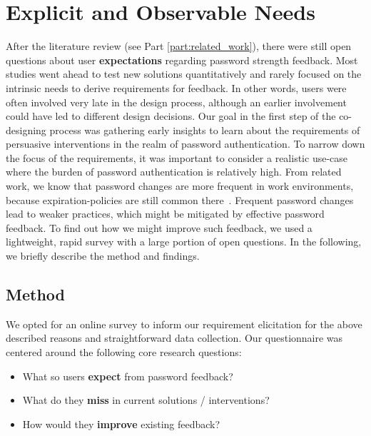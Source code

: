 \section{Explicit and Observable Needs}\label{sec:codesign:part1}
After the literature review (see Part \ref{part:related_work}), there were still open questions about user \textbf{expectations} regarding password strength feedback. Most studies went ahead to test new solutions quantitatively and rarely focused on the intrinsic needs to derive requirements for feedback. In other words, users were often involved very late in the design process, although an earlier involvement could have led to different design decisions. Our goal in the first step of the co-designing process was gathering early insights to learn about the requirements of persuasive interventions in the realm of password authentication. 
%
To narrow down the focus of the requirements, it was important to consider a realistic use-case where the burden of password authentication is relatively high. From related work, we know that password changes are more frequent in work environments, because expiration-policies are still common there \cite{Inglesant2010TrueCostOfUnusablePolicies}. Frequent password changes lead to weaker practices, which might be mitigated by effective password feedback. To find out how we might improve such feedback, we used a lightweight, rapid survey with a large portion of open questions. In the following, we briefly describe the method and findings. 

\subsection{Method}
We opted for an online survey to inform our requirement elicitation for the above described reasons and straightforward data collection. Our questionnaire was centered around the following core research questions:
\begin{itemize}
	\item What so users \textbf{expect} from password feedback?
	\item What do they \textbf{miss} in current solutions / interventions?
	\item How would they \textbf{improve} existing feedback?
\end{itemize}

